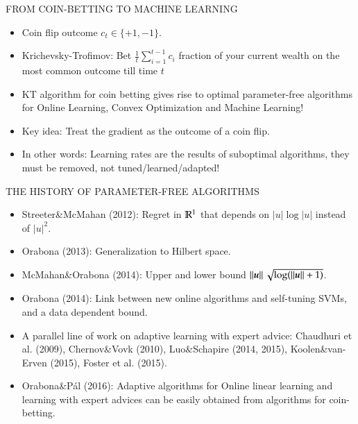 \documentclass[final,t,serif,mathserif]{beamer}
\def\blockspacea{\vspace{0.cm}}
\begin{document}
\begin{frame}{}
\begin{columns}[t]
\begin{column}{.33\linewidth}
\begin{block}{FROM COIN-BETTING TO MACHINE LEARNING}
    \vspace{1cm}

    \begin{itemize}
      \item Coin flip outcome $c_t \in \{+1, -1\}$.
      \item Krichevsky-Trofimov: Bet $\tfrac{1}{t} \sum_{i=1}^{t-1} c_i$ fraction of your current wealth on the most common outcome till time $t$
      \item \alert{KT algorithm for coin betting gives rise to optimal parameter-free algorithms for Online Learning, Convex Optimization and Machine Learning!}
      \item Key idea: Treat the gradient as the outcome of a coin flip.
      \item In other words: \alert{Learning rates are the results of suboptimal algorithms, they must be removed, not tuned/learned/adapted!}
    \end{itemize}
    
    \blockspacea
    \end{block}

    \begin{block}{THE HISTORY OF PARAMETER-FREE ALGORITHMS}
    \blockspacea
    
    \begin{itemize}
    \item Streeter\&McMahan (2012): Regret in $\mathbb{R}^1$ that depends on $|u| \log|u|$ instead of $|u|^2$.
    \item Orabona (2013): Generalization to Hilbert space.
    \item McMahan\&Orabona (2014): Upper and lower bound $\left\|{\boldsymbol{u}}\right\| \sqrt{\log(\left\|{\boldsymbol{u}}\right\|+1)}$.
    \item Orabona (2014): Link between new online algorithms and self-tuning SVMs, and a data dependent bound.
    \item A parallel line of work on adaptive learning with expert advice: Chaudhuri et al. (2009), Chernov\&Vovk (2010), Luo\&Schapire (2014, 2015), Koolen\&van-Erven (2015), Foster et al. (2015).
    \item Orabona\&P\'al (2016): Adaptive algorithms for Online linear learning and learning with expert advices can be easily obtained from algorithms for coin-betting.
    \end{itemize}


\end{block}
\end{column}
\end{columns}
\end{frame}
\end{document}
